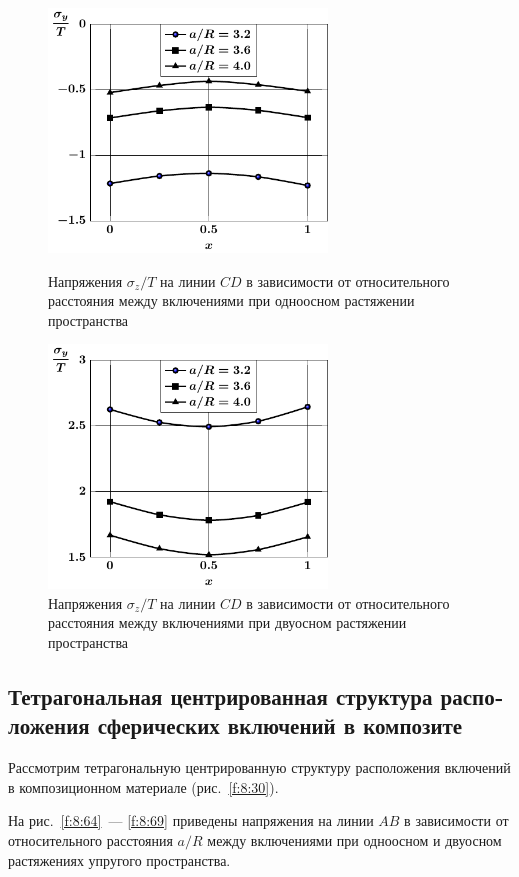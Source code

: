 \begin{russian}
\begin{figure}[h!]
\centering\footnotesize
\parbox[b]{7.5cm}{\centering\includegraphics[width=7.41cm]{inc5-a-d95-g25-t1-cd-sig_y.pdf}
\caption{Напряжения $\sigma_z/T$ на линии  $CD$ в зависимости от относительного расстояния между включениями при одноосном растяжении пространства
\label{f:8:62}}}\hfil\hfil
\parbox[b]{7.5cm}{\centering\includegraphics[width=7.41cm]{inc5-a-d95-g25-t2-cd-sig_y.pdf}
\caption{Напряжения $\sigma_z/T$ на линии  $CD$ в зависимости от относительного расстояния между включениями при двуосном растяжении пространства
\label{f:8:63}}}
\end{figure}

\subsection{Тетрагональная центрированная структура расположения сферических включений в композите}

Рассмотрим тетрагональную центрированную структуру расположения включений в композиционном материале (рис.~\ref{f:8:30}).

На рис.~\ref{f:8:64}~--- \ref{f:8:69} приведены напряжения на линии $AB$ в зависимости от относительного расстояния $a/R$ между включениями при одноосном и двуосном растяжениях упругого пространства.


\end{russian}

